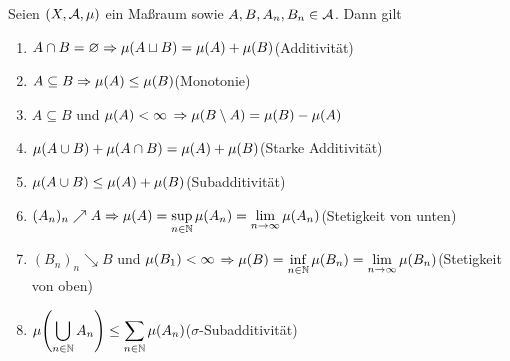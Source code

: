 \begin{satz} %
    \label{satz:eigenschaften-mass}
    Seien $\left(X, \mathcal{A}, \mu\right)$ ein Maßraum sowie $A, B, A_n, B_n \in\mathcal{A}$. Dann gilt
    \begin{enumerate}[label=(\roman*)]
        \item $A \cap B = \emptyset \impl \mu\of{A \sqcup B} = \mu\of{A} + \mu\of{B}$\hfill (Additivität)
        \item $A \subseteq B \impl \mu\of{A} \leq \mu\of{B}$\hfill (Monotonie)
        \item $A \subseteq B$ und $\mu\of{A} < \infty$ $\impl \mu\of{B\setminus A} = \mu\of{B} - \mu\of{A}$
        \item $\mu\of{A\cup B} + \mu\of{A \cap B} = \mu\of{A} + \mu\of{B}$\hfill (Starke Additivität)
        \item $\mu\of{A \cup B} \leq \mu\of{A} + \mu\of{B}$\hfill (Subadditivität)
        \item $(A_n)_n\nearrow A \impl \displaystyle\mu\of{A} = \sup_{n\in\N} \mu\of{A_n} = \lim_{n\toinf} \mu\of{A_n}$\hfill (Stetigkeit von unten)
        \item $(B_n)_n\searrow B$ und $\mu\of{B_1} < \infty$ $\impl \displaystyle\mu\of{B} = \inf_{n\in\N} \mu\of{B_n} = \lim_{n\toinf} \mu\of{B_n}$\hfill (Stetigkeit von oben)
        \item $\displaystyle\mu\of{\bigcup_{n\in\N} A_n} \leq \sum_{n\in\N}^{} \mu\of{A_n}$\hfill ($\sigma$-Subadditivität)
    \end{enumerate}


\end{satz}
